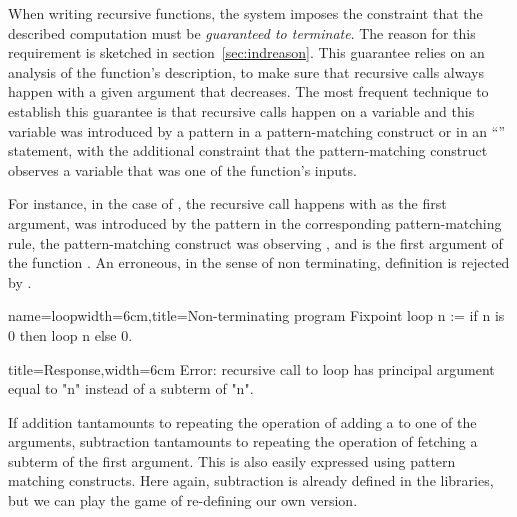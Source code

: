 When writing recursive functions, the \Coq{} system imposes the
constraint that the described computation must be \emph{guaranteed to
terminate}.  The reason for this requirement is sketched in
section~\ref{sec:indreason}.
This guarantee relies on an analysis of the function's
description, to make sure that recursive calls always happen with a
given argument that decreases.  The most frequent technique to
establish this guarantee is that recursive calls happen on a variable
and this variable was introduced by a pattern in a pattern-matching
construct or in an ``'' statement, with the additional
constraint that the pattern-matching construct observes a variable
that was one of the function's inputs.

For instance, in the case of , the recursive call happens
with  as the first argument,  was introduced by the pattern 
in the corresponding pattern-matching rule, the pattern-matching
construct was observing , and  is the first argument of the
function .  An erroneous, in the sense of non terminating,
definition is rejected by \Coq{}.

\begin{coq}{name=loop}{width=6cm,title=Non-terminating program}
Fixpoint loop n :=
 if n is 0 then loop n else 0.
$~$
\end{coq}
\begin{coqout}{}{title=Response,width=6cm}
Error: recursive call to loop has
principal argument equal to  "n"
instead of a subterm of "n".
\end{coqout}

% 
% 
If addition tantamounts to repeating the operation of adding a 
to one of the arguments, subtraction tantamounts to repeating the
operation of fetching a subterm of the first argument.  This is also
easily expressed using pattern matching constructs.  Here again,
subtraction is already defined in the libraries, but we can play the game
of re-defining our own version.

